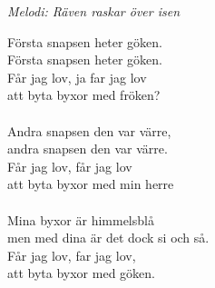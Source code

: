 {\footnotesize\textit{Melodi: Räven raskar över isen}}\par
\vspace{10pt}
Första snapsen heter göken.\\
Första snapsen heter göken.\\
Får jag lov, ja far jag lov\\
att byta byxor med fröken?\\
\\
Andra snapsen den var värre,\\
andra snapsen den var värre.\\
Får jag lov, får jag lov\\
att byta byxor med min herre\\
\\
Mina byxor är himmelsblå\\
men med dina är det dock si och så.\\
Får jag lov, far jag lov,\\
att byta byxor med göken.
